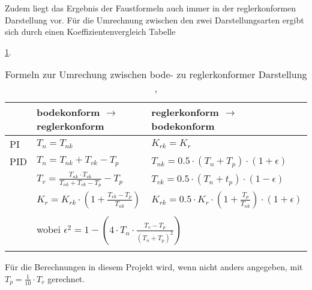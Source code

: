 Zudem   liegt   das   Ergebnis   der    Faustformeln   auch   immer   in   der
reglerkonformen  Darstellung  vor. F\"ur  die  Umrechnung  zwischen  den  zwei
Darstellungsarten  ergibt  sich  durch  einen  Koeffizientenvergleich  Tabelle

\ref{tab:bode_regler_konform}.

\begin{longtable}{l|ll}
    \toprule


    &
    bodekonform $\rightarrow$ reglerkonform
    &
    reglerkonform $\rightarrow$ bodekonform
    \\

    \midrule

    \endhead
    \endfoot
    \endlastfoot


    PI
    &
    $T_n = T_{nk} $ %
    &
    $K_{rk} = K_r $ %
    \\

    \midrule

    PID
    &
    $T_n = T_{nk}+T_{vk}-T_p$
    &
    $T_{nk}=0.5 \cdot (T_n+T_p) \cdot (1+\epsilon)$
    \\

    &
    $T_v=\frac{T_{nk} \cdot T_{vk}}{T_{nk}+T_{vk}-T_p}-T_p$
    &
    $T_{vk}=0.5 \cdot (T_n+t_p) \cdot (1-\epsilon)$
    \\

    &
    $K_r=K_{rk} \cdot (1 + \frac{T_{vk}-T_p}{T_{nk}})$
    &
    $K_{rk} = 0.5 \cdot K_r \cdot (1 + \frac{T_p}{T_{nk}}) \cdot (1+\epsilon )$
    \\
    \\

    &
    \multicolumn{2}{l}{wobei $\epsilon^2 = 1-(4 \cdot T_n \cdot \frac{T_v-T_p}{(T_n+T_p)^2})$}
    \\
    \bottomrule
    \caption{Formeln zur Umrechung zwischen bode- zu reglerkonformer Darstellung \cite{regelungstechnik:zellweger}, \cite{regelungstechnik:schumleon}}
    \label{tab:bode_regler_konform}
\end{longtable}


F\"ur die Berechnungen in diesem Projekt wird, wenn nicht anders angegeben, mit $T_p=\frac{1}{10} \cdot T_v$ gerechnet.
